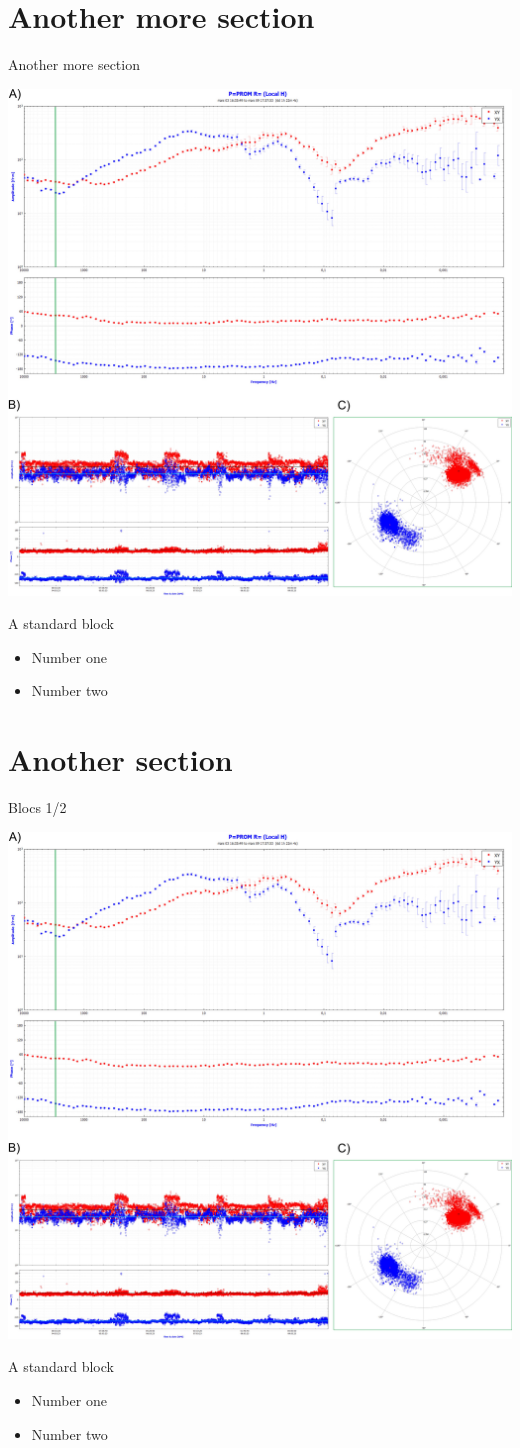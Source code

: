 \documentclass[11pt]{beamer}
\begin{document}
\section{Another more section}
\begin{frame}{Another more section}
	\begin{center}
		\includegraphics[width = .35\textwidth]{phd-isterre-poster-2023-fig.jpg}
	\end{center}
	\begin{block} {A standard block}
		\begin{itemize}
			\item Number one
			\item Number two
		\end{itemize}
	\end{block}
\end{frame}



\section{Another section}
\begin{frame}{Blocs 1/2}
	\begin{center}
		\includegraphics[width = .35\textwidth]{phd-isterre-poster-2023-fig.jpg}
	\end{center}
	\begin{block} {A standard block}
		\begin{itemize}
			\pause
			\item Number one
			\pause
			\item Number two
		\end{itemize}
	\end{block}
\end{frame}
\end{document}
